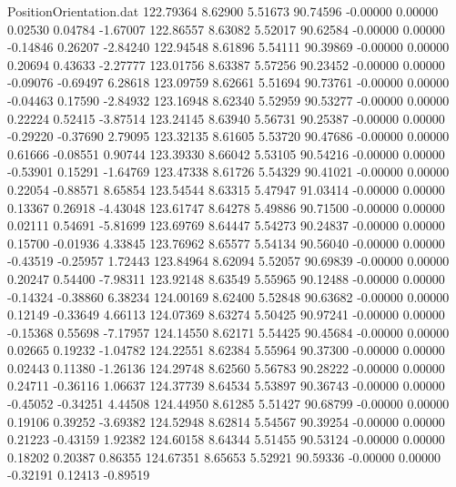 \begin{filecontents}{PositionOrientation.dat}
 122.79364    8.62900    5.51673    90.74596   -0.00000    0.00000    0.02530    0.04784   -1.67007
 122.86557    8.63082    5.52017    90.62584   -0.00000    0.00000   -0.14846    0.26207   -2.84240
 122.94548    8.61896    5.54111    90.39869   -0.00000    0.00000    0.20694    0.43633   -2.27777
 123.01756    8.63387    5.57256    90.23452   -0.00000    0.00000   -0.09076   -0.69497    6.28618
 123.09759    8.62661    5.51694    90.73761   -0.00000    0.00000   -0.04463    0.17590   -2.84932
 123.16948    8.62340    5.52959    90.53277   -0.00000    0.00000    0.22224    0.52415   -3.87514
 123.24145    8.63940    5.56731    90.25387   -0.00000    0.00000   -0.29220   -0.37690    2.79095
 123.32135    8.61605    5.53720    90.47686   -0.00000    0.00000    0.61666   -0.08551    0.90744
 123.39330    8.66042    5.53105    90.54216   -0.00000    0.00000   -0.53901    0.15291   -1.64769
 123.47338    8.61726    5.54329    90.41021   -0.00000    0.00000    0.22054   -0.88571    8.65854
 123.54544    8.63315    5.47947    91.03414   -0.00000    0.00000    0.13367    0.26918   -4.43048
 123.61747    8.64278    5.49886    90.71500   -0.00000    0.00000    0.02111    0.54691   -5.81699
 123.69769    8.64447    5.54273    90.24837   -0.00000    0.00000    0.15700   -0.01936    4.33845
 123.76962    8.65577    5.54134    90.56040   -0.00000    0.00000   -0.43519   -0.25957    1.72443
 123.84964    8.62094    5.52057    90.69839   -0.00000    0.00000    0.20247    0.54400   -7.98311
 123.92148    8.63549    5.55965    90.12488   -0.00000    0.00000   -0.14324   -0.38860    6.38234
 124.00169    8.62400    5.52848    90.63682   -0.00000    0.00000    0.12149   -0.33649    4.66113
 124.07369    8.63274    5.50425    90.97241   -0.00000    0.00000   -0.15368    0.55698   -7.17957
 124.14550    8.62171    5.54425    90.45684   -0.00000    0.00000    0.02665    0.19232   -1.04782
 124.22551    8.62384    5.55964    90.37300   -0.00000    0.00000    0.02443    0.11380   -1.26136
 124.29748    8.62560    5.56783    90.28222   -0.00000    0.00000    0.24711   -0.36116    1.06637
 124.37739    8.64534    5.53897    90.36743   -0.00000    0.00000   -0.45052   -0.34251    4.44508
 124.44950    8.61285    5.51427    90.68799   -0.00000    0.00000    0.19106    0.39252   -3.69382
 124.52948    8.62814    5.54567    90.39254   -0.00000    0.00000    0.21223   -0.43159    1.92382
 124.60158    8.64344    5.51455    90.53124   -0.00000    0.00000    0.18202    0.20387    0.86355
 124.67351    8.65653    5.52921    90.59336   -0.00000    0.00000   -0.32191    0.12413   -0.89519

\end{filecontents}
